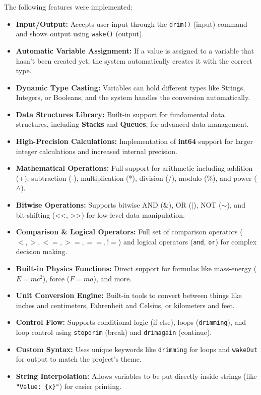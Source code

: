 \documentclass[12pt, a4paper]{article}
\begin{document}
The following features were implemented:
\begin{itemize}
    \item \textbf{Input/Output:} Accepts user input through the \texttt{drim()} (input) command and shows output using \texttt{wake()} (output).
    \item \textbf{Automatic Variable Assignment:} If a value is assigned to a variable that hasn't been created yet, the system automatically creates it with the correct type.
    \item \textbf{Dynamic Type Casting:} Variables can hold different types like Strings, Integers, or Booleans, and the system handles the conversion automatically.
    \item \textbf{Data Structures Library:} Built-in support for fundamental data structures, including \textbf{Stacks} and \textbf{Queues}, for advanced data management.
    \item \textbf{High-Precision Calculations:} Implementation of \textbf{int64} support for larger integer calculations and increased internal precision.
    \item \textbf{Mathematical Operations:} Full support for arithmetic including addition (+), subtraction (-), multiplication (*), division (/), modulo (\%), and power ($\wedge$).
    \item \textbf{Bitwise Operations:} Supports bitwise AND (\&), OR ($|$), NOT ($\sim$), and bit-shifting (<<, >>) for low-level data manipulation.
    \item \textbf{Comparison \& Logical Operators:} Full set of comparison operators ($<, >, <=, >=, ==, !=$) and logical operators (\texttt{and}, \texttt{or}) for complex decision making.
    \item \textbf{Built-in Physics Functions:} Direct support for formulas like mass-energy ($E=mc^2$), force ($F=ma$), and more.
    \item \textbf{Unit Conversion Engine:} Built-in tools to convert between things like inches and centimeters, Fahrenheit and Celsius, or kilometers and feet.
    \item \textbf{Control Flow:} Supports conditional logic (if-else), loops (\texttt{drimming}), and loop control using \texttt{stopdrim} (break) and \texttt{drimagain} (continue).
    \item \textbf{Custom Syntax:} Uses unique keywords like \texttt{drimming} for loops and \texttt{wakeOut} for output to match the project's theme.
    \item \textbf{String Interpolation:} Allows variables to be put directly inside strings (like \texttt{"Value: \{x\}"}) for easier printing.

\end{itemize}
\end{document}
